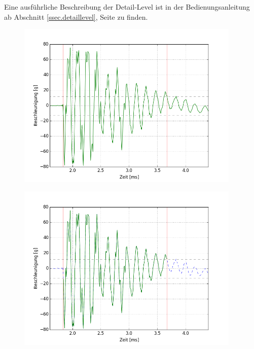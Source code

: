 Eine ausführliche Beschreibung der Detail-Level ist in der Bedienungsanleitung ab Abschnitt \ref{ssec.detaillevel}, Seite \pageref{ssec.detaillevel} zu finden.

\begin{figure}
\centering
\begin{minipage}{0.5\textwidth}
\centering
		\includegraphics[width=0.95\textwidth]{images/rawshort.png}
	\label{fig.det_raw}
\end{minipage}%
\begin{minipage}{0.5\textwidth}
\centering
		\includegraphics[width=0.95\textwidth]{images/detailed.png}
	\label{fig.det_det}
\end{minipage}
\end{figure}

